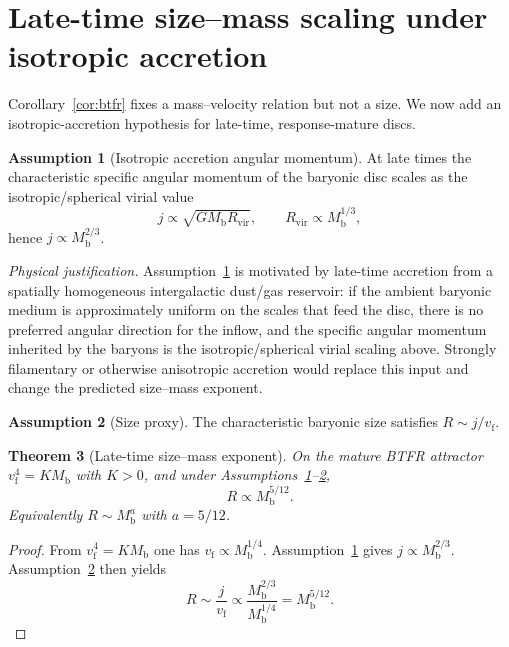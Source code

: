 \documentclass[11pt]{article}
\newtheorem{theorem}{Theorem}[section]
\theoremstyle{definition}
\newtheorem{assumption}[theorem]{Assumption}
\theoremstyle{remark}
\newcommand{\Mb}{M_{\mathrm{b}}}
\newcommand{\vf}{v_{\mathrm{f}}}
\begin{document}
\section{Late-time size--mass scaling under isotropic accretion}
\label{sec:size-mass}
Corollary~\ref{cor:btfr} fixes a mass--velocity relation but not a size.
We now add an isotropic-accretion hypothesis for late-time, response-mature discs.

\begin{assumption}[Isotropic accretion angular momentum]
\label{ass:iso-accretion}
At late times the characteristic specific angular momentum of the baryonic disc scales as the isotropic/spherical virial value
\begin{equation}
  j\propto\sqrt{G\Mb R_{\mathrm{vir}}},\qquad R_{\mathrm{vir}}\propto\Mb^{1/3},
\end{equation}
hence $j\propto\Mb^{2/3}$.
\end{assumption}

\noindent\textit{Physical justification.}
Assumption~\ref{ass:iso-accretion} is motivated by late-time accretion from a spatially homogeneous intergalactic dust/gas reservoir: if the ambient baryonic medium is approximately uniform on the scales that feed the disc, there is no preferred angular direction for the inflow, and the specific angular momentum inherited by the baryons is the isotropic/spherical virial scaling above.
Strongly filamentary or otherwise anisotropic accretion would replace this input and change the predicted size--mass exponent.

\begin{assumption}[Size proxy]
\label{ass:size-proxy}
The characteristic baryonic size satisfies $R\sim j/\vf$.
\end{assumption}

\begin{theorem}[Late-time size--mass exponent]
\label{thm:size-mass}
On the mature BTFR attractor $\vf^{4}=K\Mb$ with $K>0$, and under Assumptions~\ref{ass:iso-accretion}--\ref{ass:size-proxy},
\begin{equation}
  R\propto\Mb^{5/12}.
  \label{eq:size-mass}
\end{equation}
Equivalently $R\sim\Mb^{a}$ with $a=5/12$.
\end{theorem}

\begin{proof}
From $\vf^{4}=K\Mb$ one has $\vf\propto\Mb^{1/4}$.
Assumption~\ref{ass:iso-accretion} gives $j\propto\Mb^{2/3}$.
Assumption~\ref{ass:size-proxy} then yields
\[
  R\sim\frac{j}{\vf}\propto\frac{\Mb^{2/3}}{\Mb^{1/4}}=\Mb^{5/12}.
\]
\end{proof}
\end{document}
